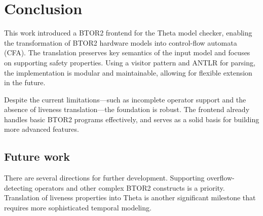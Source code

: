 \begin{table}[]
\caption{Summary of errors}
\end{table}

\section{Conclusion}
This work introduced a BTOR2 frontend for the Theta model checker, enabling the transformation of BTOR2 hardware models into control-flow automata (CFA). The translation preserves key semantics of the input model and focuses on supporting safety properties. Using a visitor pattern and ANTLR for parsing, the implementation is modular and maintainable, allowing for flexible extension in the future.

Despite the current limitations—such as incomplete operator support and the absence of liveness translation—the foundation is robust. The frontend already handles basic BTOR2 programs effectively, and serves as a solid basis for building more advanced features.

\subsection{Future work}
There are several directions for further development. Supporting overflow-detecting operators and other complex BTOR2 constructs is a priority. Translation of liveness properties into Theta is another significant milestone that requires more sophisticated temporal modeling.

